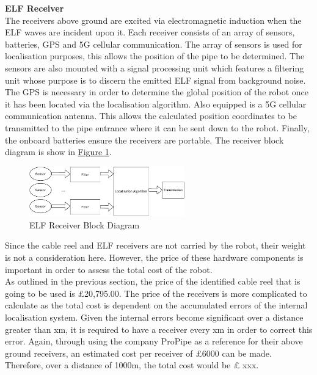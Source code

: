 \documentclass[11pt]{article}		%
\newcommand{\figref}[1]{\hyperref[#1]{Figure \ref*{#1}}}    %
\begin{document}
			\textbf{ELF Receiver}\\
			The receivers above ground are excited via electromagnetic induction when the ELF waves are incident upon it. Each receiver consists of an array of sensors, batteries, GPS and 5G cellular communication. The array of sensors is used for localisation purposes, this allows the position of the pipe to be determined. The sensors are also mounted with a signal processing unit which features a filtering unit whose purpose is to discern the emitted ELF signal from background noise. The GPS is necessary in order to determine the global position of the robot once it has been located via the localisation algorithm. Also equipped is a 5G cellular communication antenna. This allows the calculated position coordinates to be transmitted to the pipe entrance where it can be sent down to the robot.  Finally, the onboard batteries ensure the receivers are portable. The receiver block diagram is show in \figref{ELFrec}.
		    
		    \begin{figure}[h]
				\centering
				\includegraphics[width=0.6\textwidth]{blockreceiever}
				\caption{ELF Receiver Block Diagram}
				\label{ELFrec}
			\end{figure}
			
			Since the cable reel and ELF receivers are not carried by the robot, their weight is not a consideration here. However, the price of these hardware components is important in order to assess the total cost of the robot. \\
			\hspace*{3ex}As outlined in the previous section, the price of the identified cable reel that is going to be used is £20,795.00. The price of the receivers is more complicated to calculate as the total cost is dependent on the accumulated errors of the internal localisation system. Given the internal errors become significant over a distance greater than xm, it is required to have a receiver every xm in order to correct this error. Again, through using the company ProPipe as a reference for their above ground receivers, an estimated cost per receiver of £6000 can be made. Therefore, over a distance of 1000m, the total cost would be £ xxx. 
	
\end{document}
